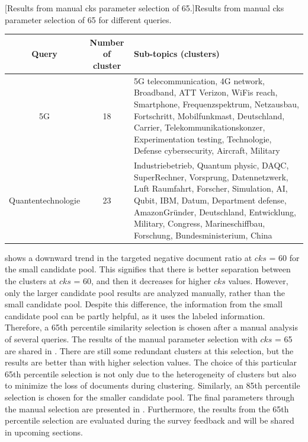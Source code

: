  
 \begin{center}
 	[Results from manual cks parameter selection of 65.]{Results from manual cks parameter selection of 65 for different queries. }\label{tab:65_output}
 	\begin{tabularx}{.9\textwidth}{|c|c|Y|}
 		\hline
 		Query & Number of cluster & Sub-topics (clusters)\\
 		\hline
 		
 		5G  &          18 & 5G telecommunication, 4G network, Broadband, ATT Verizon, WiFis reach, Smartphone, Frequenzspektrum, Netzausbau, Fortschritt, Mobilfunkmast, Deutschland, Carrier, Telekommunikationskonzer, Experimentation testing, Technologie, Defense cybersecurity, Aircraft, Military \\  \hline
 		
 		Quantentechnologie &          23 & Industriebetrieb, Quantum physic, DAQC, SuperRechner, Vorsprung, Datennetzwerk, Luft Raumfahrt, Forscher, Simulation, AI, Qubit, IBM, Datum, Department defense, AmazonGründer, Deutschland, Entwicklung, Military, Congress, Marineschiffbau, Forschung, Bundesministerium, China \\  \hline
 		
 	\end{tabularx}
 
  \end{center}


 shows a downward trend in the targeted negative document ratio at $cks$ = 60 for the small candidate pool. This signifies that there is better separation between the clusters at $cks$ = 60, and then it decreases for higher $cks$ values. However, only the larger candidate pool results are analyzed manually, rather than the small candidate pool. Despite this difference, the information from the small candidate pool can be partly helpful, as it uses the labeled information. Therefore, a 65th percentile similarity selection is chosen after a manual analysis of several queries. The results of the manual parameter selection with $cks$ = 65 are shared in . There are still some redundant clusters at this selection, but the results are better than with higher selection values. The choice of this particular 65th percentile selection is not only due to the heterogeneity of clusters but also to minimize the loss of documents during clustering. Similarly, an 85th percentile selection is chosen for the smaller candidate pool. The final parameters through the manual selection are presented in . Furthermore, the results from the 65th percentile selection are evaluated during the survey feedback and will be shared in upcoming sections.
 
